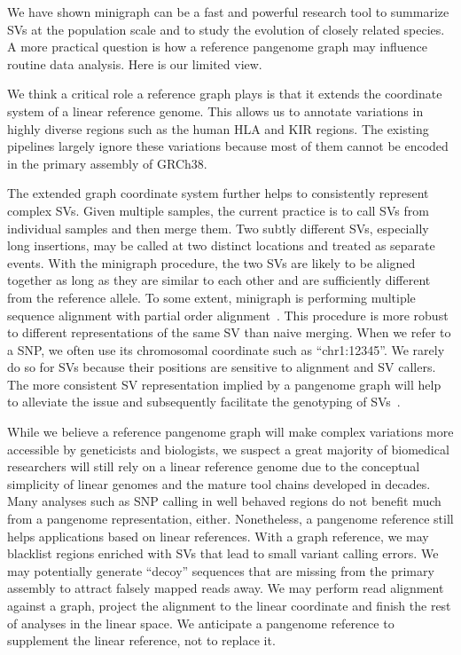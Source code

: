 \documentclass[twocolumn]{bmcart}
\begin{document}
We have shown minigraph can be a fast and powerful research tool to summarize
SVs at the population scale and to study the evolution of closely related
species. A more practical question is how a reference pangenome graph may
influence routine data analysis. Here is our limited view.

We think a critical role a reference graph plays is that it extends the
coordinate system of a linear reference genome. This allows us to annotate
variations in highly diverse regions such as the human HLA and KIR regions. The
existing pipelines largely ignore these variations because most of them cannot
be encoded in the primary assembly of GRCh38.

The extended graph coordinate system further helps to consistently represent
complex SVs. Given multiple samples, the current practice is to call SVs from
individual samples and then merge them. Two subtly different SVs, especially
long insertions, may be called at two distinct locations and treated as
separate events. With the minigraph procedure, the two SVs are likely to
be aligned together as long as they are similar to each other and are
sufficiently different from the reference allele. To some extent, minigraph is
performing multiple sequence alignment with partial order
alignment~\cite{Lee_2002}. This procedure is more robust to different
representations of the same SV than naive merging. When we refer to a SNP, we often use its
chromosomal coordinate such as ``chr1:12345''. We rarely do so for SVs because
their positions are sensitive to alignment and SV callers. The more consistent
SV representation implied by a pangenome graph will help to alleviate the issue
and subsequently facilitate the genotyping of
SVs~\cite{Hickey_2020,Eggertsson_2019,Chen_2019}.

While we believe a reference pangenome graph will make complex variations more
accessible by geneticists and biologists, we suspect a great majority of
biomedical researchers will still rely on a linear reference genome due to the
conceptual simplicity of linear genomes and the mature tool chains developed in
decades. Many analyses such as SNP calling in well behaved regions do not
benefit much from a pangenome representation, either. Nonetheless, a pangenome
reference still helps applications based on linear references. With a graph
reference, we may blacklist regions enriched with SVs that lead to small variant
calling errors.  We may potentially generate ``decoy'' sequences that are
missing from the primary assembly to attract falsely mapped reads away. We may
perform read alignment against a graph, project the alignment to the linear
coordinate and finish the rest of analyses in the linear space. We anticipate a
pangenome reference to supplement the linear reference, not to replace it.
\end{document}
